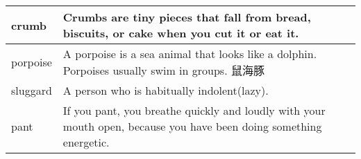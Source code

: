 \documentclass{article}
\begin{document}
\begin{center}
\begin{longtable}{|l|p{9cm}|}
\hline
crumb
&
Crumbs are tiny pieces that fall from bread, biscuits, or cake when you cut it or eat it.
\\

\hline
porpoise
&
A porpoise is a sea animal that looks like a dolphin. Porpoises usually swim in groups. 鼠海豚
\\

\hline
sluggard
&
A person who is habitually indolent(lazy).
\\

\hline
pant
&
If you pant, you breathe quickly and loudly with your mouth open, because you have been doing something energetic.
\\

\hline

\end{longtable}
\end{center}
\end{document}
